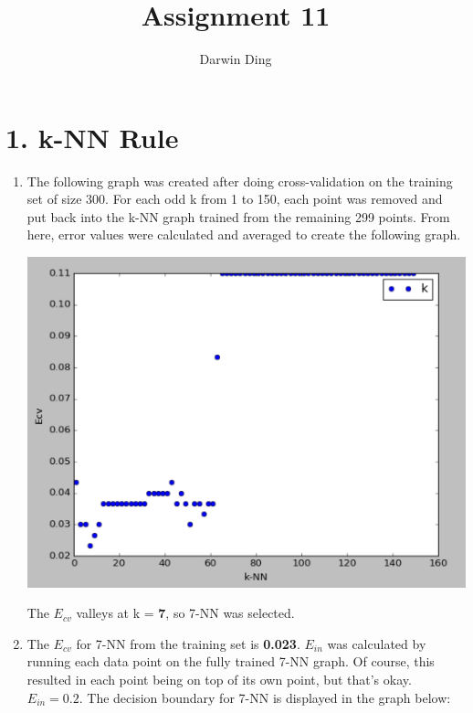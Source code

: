 \documentclass[12pt]{article}
\begin{document}
\title{Assignment 11}
\author{Darwin Ding}
\maketitle

\section*{1. k-NN Rule}
\begin{enumerate}[label=(\alph*)]
	\item The following graph was created after doing cross-validation on the training set of size 300. For each odd k from 1 to 150, each point was removed and put back into the k-NN graph trained from the remaining 299 points. From here, error values were calculated and averaged to create the following graph.
	
	\includegraphics[scale=0.6]{1a.png}
	
	The $E_{cv}$ valleys at k = \textbf{7}, so 7-NN was selected.
	\item The $E_{cv}$ for 7-NN from the training set is \textbf{0.023}. $E_{in}$ was calculated by running each data point on the fully trained 7-NN graph. Of course, this resulted in each point being on top of its own point, but that's okay. $E_{in} = \boldsymbol{0.2}$. The decision boundary for 7-NN is displayed in the graph below:
	

\end{enumerate}
\end{document}
